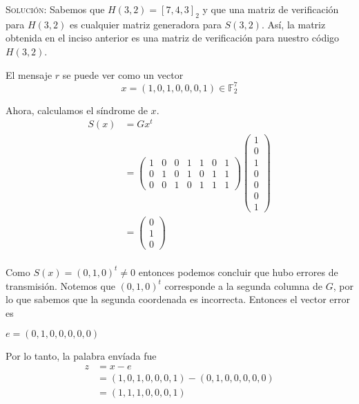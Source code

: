 \documentclass[letterpaper,11pt]{article}
\begin{document}
\begin{enumerate}
\begin{enumerate}
        \textsc{Solución:} Sabemos que $H(3,2) = [7, 4, 3]_{2}$ y que una
        matriz de verificación para $H(3,2)$ es cualquier matriz generadora
        para $S(3,2)$. Así, la matriz obtenida en el inciso anterior es una
        matriz de verificación para nuestro código $H(3,2)$.
        
        El mensaje $r$ se puede ver como un vector 
        \begin{equation*}
            x = (1, 0, 1, 0, 0, 0, 1) \in \mathbb{F}^{7}_{2}
        \end{equation*}

        Ahora, calculamos el síndrome de $x$.
        \begin{align*}
            S(x) 
            &= G x^{t} \\
            &= \begin{pmatrix}
               1 & 0 & 0 & 1 & 1 & 0 & 1\\
               0 & 1 & 0 & 1 & 0 & 1 & 1\\
               0 & 0 & 1 & 0 & 1 & 1 & 1
               \end{pmatrix}
               \begin{pmatrix}
               1 \\
               0 \\
               1 \\
               0 \\ 
               0 \\
               0 \\
               1
               \end{pmatrix} \\
            &= \begin{pmatrix}
               0 \\
               1 \\
               0 
               \end{pmatrix} \\
        \end{align*}
        
        Como $S(x) = (0, 1, 0)^{t} \neq 0$ entonces podemos concluir que hubo
        errores de transmisión. Notemos que $(0, 1, 0)^{t}$ corresponde a la 
        segunda columna de $G$, por lo que sabemos que la segunda coordenada es
        incorrecta. Entonces el vector error es
        \begin{center}
            $e = (0, 1, 0, 0, 0, 0, 0)$
        \end{center}
        
        Por lo tanto, la palabra envíada fue
        \begin{align*}
            z &= x - e \\
            &= (1, 0, 1, 0, 0, 0, 1) - (0, 1, 0, 0, 0, 0, 0) \\
            &= (1, 1, 1, 0, 0, 0, 1)
        \end{align*}
    \end{enumerate}
\end{enumerate}
\end{document}
